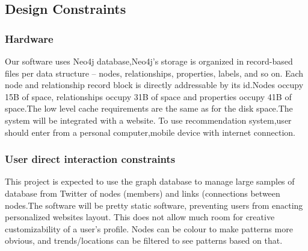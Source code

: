 \documentclass[11pt]{article}
\begin{document}
\subsection{Design Constraints}
\subsubsection{Hardware}
Our software uses Neo4j database,Neo4j’s storage is organized in record-based files per data structure – nodes, relationships, properties, labels, and so on. Each node and relationship record block is directly addressable by its id.Nodes occupy 15B
of space, relationships occupy 31B of space and properties occupy 41B of space.The low level cache requirements are the same as for the disk space.The
system  will  be  integrated  with  a  website.  To  use  recommendation  system,user 
should enter from a personal computer,mobile device with internet connection.

\subsubsection{User direct interaction constraints}
This project is expected to use the graph database to
manage large samples of database from Twitter of nodes (members) and links (connections
between nodes.The software will be pretty static software, preventing users from enacting personalized websites layout. This does not allow much room for creative customizability of a user's profile. Nodes can be colour to make patterns more obvious, and trends/locations can be filtered to see patterns based on that.
\end{document}
